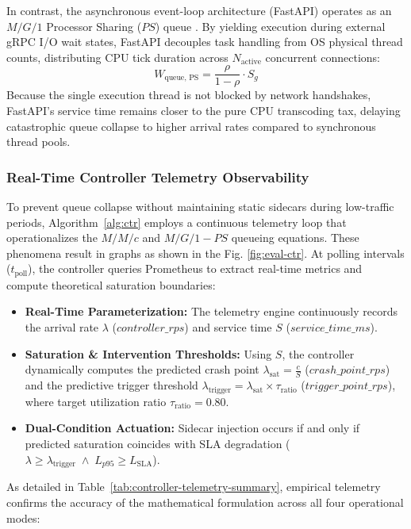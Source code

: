 \documentclass{ieeeaccess}
\begin{document}
	In contrast, the asynchronous event-loop architecture (FastAPI) operates as an $M/G/1$ Processor Sharing ($PS$) queue \cite{KahramanMG1,dalai2024novel}. By yielding execution during external gRPC I/O wait states, FastAPI decouples task handling from OS physical thread counts, distributing CPU tick duration across $N_{\text{active}}$ concurrent connections:
	\begin{equation}
		W_{\text{queue, PS}} = \frac{\rho}{1 - \rho} \cdot S_{g}
	\end{equation}
	Because the single execution thread is not blocked by network handshakes, FastAPI's service time remains closer to the pure CPU transcoding tax, delaying catastrophic queue collapse to higher arrival rates compared to synchronous thread pools.
	
	\subsubsection{Real-Time Controller Telemetry Observability}
	To prevent queue collapse without maintaining static sidecars during low-traffic periods, Algorithm~\ref{alg:ctr} employs a continuous telemetry loop that operationalizes the $M/M/c$ and $M/G/1-PS$ queueing equations. These phenomena result in graphs as shown in the Fig. \ref{fig:eval-ctr}. At polling intervals ($t_{\text{poll}}$), the controller queries Prometheus to extract real-time metrics and compute theoretical saturation boundaries:
	
	\begin{itemize}
		\item \textbf{Real-Time Parameterization:} The telemetry engine continuously records the arrival rate $\lambda$ ($controller\_rps$) and service time $S$ ($service\_time\_ms$).
		\item \textbf{Saturation \& Intervention Thresholds:} Using $S$, the controller dynamically computes the predicted crash point $\lambda_{\text{sat}} = \frac{c}{S}$ ($crash\_point\_rps$) and the predictive trigger threshold $\lambda_{\text{trigger}} = \lambda_{\text{sat}} \times \tau_{\text{ratio}}$ ($trigger\_point\_rps$), where target utilization ratio $\tau_{\text{ratio}} = 0.80$.
		\item \textbf{Dual-Condition Actuation:} Sidecar injection occurs if and only if predicted saturation coincides with SLA degradation ($\lambda \ge \lambda_{\text{trigger}} \;\land\; L_{p95} \ge L_{\text{SLA}}$).
	\end{itemize}
	
	As detailed in Table~\ref{tab:controller-telemetry-summary}, empirical telemetry confirms the accuracy of the mathematical formulation across all four operational modes:
	
\end{document}
